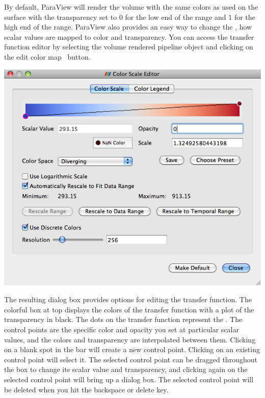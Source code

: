 By default, ParaView will render the volume with the same colors as used on
the surface with the transparency set to 0 for the low end of the range and
1 for the high end of the range.  ParaView also provides an easy way to
change the , how scalar values are mapped to
color and transparency.  You can access the transfer function editor by
selecting the volume rendered pipeline object and clicking on the edit
color map~ button.
 

\begin{inlinefig}
  \includegraphics[width=\scw]{images/ColorScaleEditor}
\end{inlinefig}

The resulting dialog box provides options for editing the transfer
function.  The colorful box at top displays the colors of the transfer
function with a plot of the transparency in black.  The dots on the
transfer function represent the .  The control
points are the specific color and opacity you set at particular scalar
values, and the colors and transparency are interpolated between them.
Clicking on a blank spot in the bar will create a new control point.
Clicking on an existing control point will select it.  The selected control
point can be dragged throughout the box to change its scalar value and
transparency, and clicking again on the selected control point will bring
up a dialog box.  The selected control point will be deleted when you hit
the backspace or delete key.


